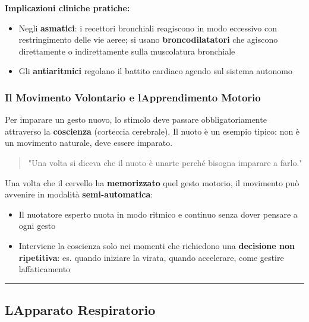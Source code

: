 \documentclass[a4paper,11pt]{article}
\providecommand{\tightlist}{%
  \setlength{\itemsep}{0pt}\setlength{\parskip}{0pt}}
\begin{document}
\textbf{Implicazioni cliniche pratiche:}

\begin{itemize}
      \tightlist
      \item
            Negli \textbf{asmatici}: i recettori bronchiali reagiscono in modo
            eccessivo con restringimento delle vie aeree; si usano
            \textbf{broncodilatatori} che agiscono direttamente o indirettamente
            sulla muscolatura bronchiale
      \item
            Gli \textbf{antiaritmici} regolano il battito cardiaco agendo sul
            sistema autonomo
\end{itemize}

\subsubsection{Il Movimento Volontario e l\textquotesingle Apprendimento
      Motorio}\label{il-movimento-volontario-e-lapprendimento-motorio}

Per imparare un gesto nuovo, lo stimolo deve passare obbligatoriamente
attraverso la \textbf{coscienza} (corteccia cerebrale). Il nuoto è un
esempio tipico: non è un movimento naturale, deve essere imparato.

\begin{quote}
      "Una volta si diceva che il nuoto è un\textquotesingle arte perché
      bisogna imparare a farlo."
\end{quote}

Una volta che il cervello ha \textbf{memorizzato} quel gesto motorio, il
movimento può avvenire in modalità \textbf{semi-automatica}:

\begin{itemize}
      \tightlist
      \item
            Il nuotatore esperto nuota in modo ritmico e continuo senza dover
            pensare a ogni gesto
      \item
            Interviene la coscienza solo nei momenti che richiedono una
            \textbf{decisione non ripetitiva}: es. quando iniziare la virata,
            quando accelerare, come gestire l\textquotesingle affaticamento
\end{itemize}

\begin{center}\rule{0.5\linewidth}{0.5pt}\end{center}

\subsection{L\textquotesingle Apparato
      Respiratorio}\label{lapparato-respiratorio}
\end{document}
